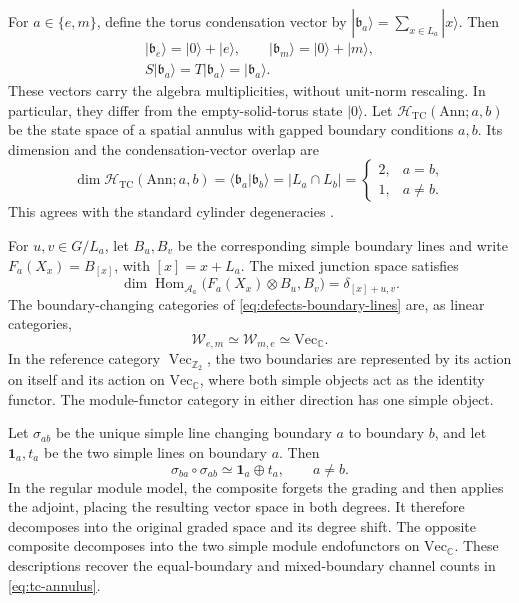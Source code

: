 \documentclass[12pt]{amsart}
\numberwithin{equation}{section}
\theoremstyle{definition}
\begin{document}
For $a\in\{e,m\}$, define the torus condensation vector by
$|\mathfrak b_a\rangle=\sum_{x\in L_a}|x\rangle$.
Then
\begin{equation}
\label{eq:tc-condensation-states}
\begin{gathered}
|\mathfrak b_e\rangle=|0\rangle+|e\rangle,
\qquad
|\mathfrak b_m\rangle=|0\rangle+|m\rangle,
\\
S|\mathfrak b_a\rangle
=
T|\mathfrak b_a\rangle
=
|\mathfrak b_a\rangle.
\end{gathered}
\end{equation}
These vectors carry the algebra multiplicities, without unit-norm
rescaling. In particular, they differ from the empty-solid-torus
state $|0\rangle$. Let $\mathcal H_{\mathrm{TC}}(\mathrm{Ann};a,b)$ be the state
space of a spatial annulus with gapped boundary conditions $a,b$.
Its dimension and the condensation-vector overlap are
\begin{equation}
\label{eq:tc-annulus}
\dim\mathcal H_{\mathrm{TC}}(\mathrm{Ann};a,b)
=
\langle\mathfrak b_a|\mathfrak b_b\rangle
=
|L_a\cap L_b|
=
\begin{cases}
2,&a=b,\\
1,&a\ne b.
\end{cases}
\end{equation}
This agrees with the standard cylinder degeneracies
\cite[Supplemental Material, Section~I]{LanWangWen2015TC}.

For $u,v\in G/L_a$, let $B_u,B_v$ be the corresponding simple
boundary lines and write $F_a(X_x)=B_{[x]}$, with $[x]=x+L_a$.
The mixed junction space satisfies
\begin{equation}
\label{eq:tc-boundary-junction}
\dim\operatorname{Hom}_{\mathcal A_a}
\bigl(F_a(X_x)\otimes B_u,B_v\bigr)
=
\delta_{[x]+u,v}.
\end{equation}
The boundary-changing categories of
\eqref{eq:defects-boundary-lines} are, as linear categories,
$$
\mathcal W_{e,m}\simeq\mathcal W_{m,e}
\simeq\mathrm{Vec}_{\mathbb C}.
$$
In the reference category $\operatorname{Vec}_{\mathbb Z_2}$,
the two boundaries are represented by its action on itself and
its action on $\mathrm{Vec}_{\mathbb C}$, where both simple objects
act as the identity functor. The module-functor category in either
direction has one simple object.

Let $\sigma_{ab}$ be the unique simple line changing boundary
$a$ to boundary $b$, and let $\mathbf1_a,t_a$ be the two simple
lines on boundary $a$. Then
\begin{equation}
\label{eq:tc-changing-lines}
\sigma_{ba}\circ\sigma_{ab}
\simeq
\mathbf1_a\oplus t_a,
\qquad a\ne b.
\end{equation}
In the regular module model, the composite forgets the grading
and then applies the adjoint, placing the resulting vector space
in both degrees. It therefore decomposes into the original graded
space and its degree shift. The opposite composite decomposes
into the two simple module endofunctors on
$\mathrm{Vec}_{\mathbb C}$. These descriptions recover the
equal-boundary and mixed-boundary channel counts in
\eqref{eq:tc-annulus}.
\end{document}
